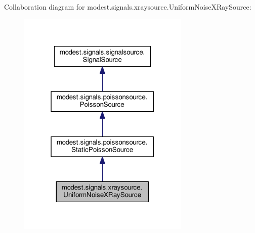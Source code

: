 Collaboration diagram for modest.\+signals.\+xraysource.\+Uniform\+Noise\+X\+Ray\+Source\+:\nopagebreak
\begin{figure}[H]
\begin{center}
\leavevmode
\includegraphics[width=232pt]{classmodest_1_1signals_1_1xraysource_1_1UniformNoiseXRaySource__coll__graph}
\end{center}
\end{figure}
